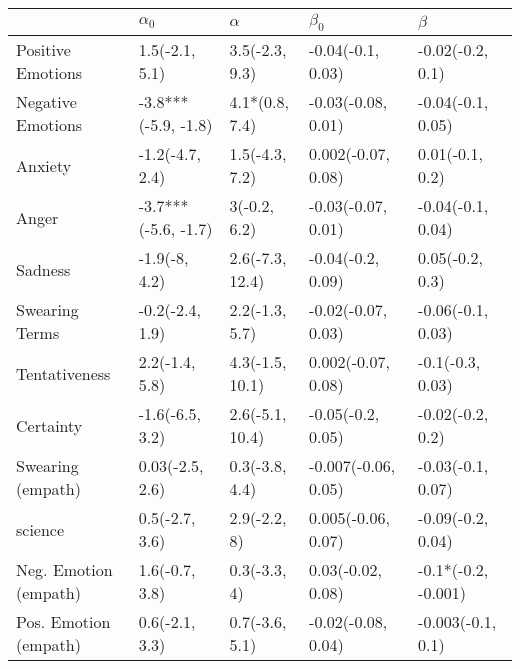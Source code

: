 \begin{tabular}{lllll}
\toprule
{} &           $\alpha_0$ &         $\alpha$ &            $\beta_0$ &              $\beta$ \\
\midrule
Positive Emotions     &       1.5(-2.1, 5.1) &   3.5(-2.3, 9.3) &    -0.04(-0.1, 0.03) &     -0.02(-0.2, 0.1) \\
Negative Emotions     &  -3.8***(-5.9, -1.8) &   4.1*(0.8, 7.4) &   -0.03(-0.08, 0.01) &    -0.04(-0.1, 0.05) \\
Anxiety               &      -1.2(-4.7, 2.4) &   1.5(-4.3, 7.2) &   0.002(-0.07, 0.08) &      0.01(-0.1, 0.2) \\
Anger                 &  -3.7***(-5.6, -1.7) &     3(-0.2, 6.2) &   -0.03(-0.07, 0.01) &    -0.04(-0.1, 0.04) \\
Sadness               &        -1.9(-8, 4.2) &  2.6(-7.3, 12.4) &    -0.04(-0.2, 0.09) &      0.05(-0.2, 0.3) \\
Swearing Terms        &      -0.2(-2.4, 1.9) &   2.2(-1.3, 5.7) &   -0.02(-0.07, 0.03) &    -0.06(-0.1, 0.03) \\
Tentativeness         &       2.2(-1.4, 5.8) &  4.3(-1.5, 10.1) &   0.002(-0.07, 0.08) &     -0.1(-0.3, 0.03) \\
Certainty             &      -1.6(-6.5, 3.2) &  2.6(-5.1, 10.4) &    -0.05(-0.2, 0.05) &     -0.02(-0.2, 0.2) \\
Swearing (empath)     &      0.03(-2.5, 2.6) &   0.3(-3.8, 4.4) &  -0.007(-0.06, 0.05) &    -0.03(-0.1, 0.07) \\
science               &       0.5(-2.7, 3.6) &     2.9(-2.2, 8) &   0.005(-0.06, 0.07) &    -0.09(-0.2, 0.04) \\
Neg. Emotion (empath) &       1.6(-0.7, 3.8) &     0.3(-3.3, 4) &    0.03(-0.02, 0.08) &  -0.1*(-0.2, -0.001) \\
Pos. Emotion (empath) &       0.6(-2.1, 3.3) &   0.7(-3.6, 5.1) &   -0.02(-0.08, 0.04) &    -0.003(-0.1, 0.1) \\
\bottomrule
\end{tabular}

